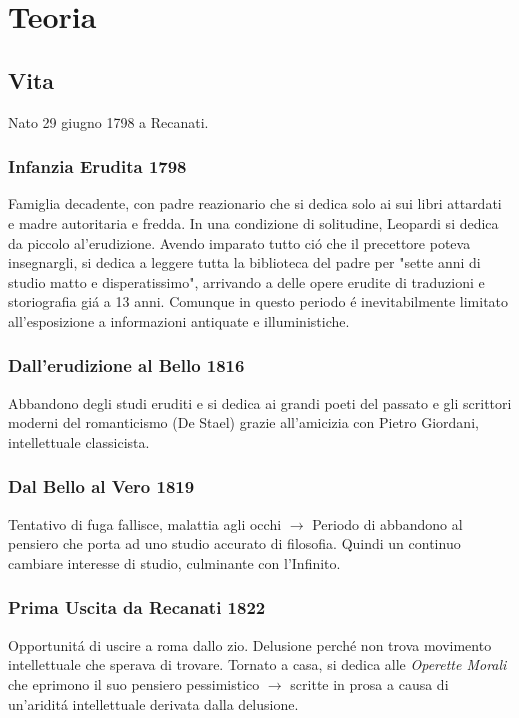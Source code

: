 \documentclass{report}
\title{\jobname}
\author{Eugenio Animali}
\begin{document}
\maketitle
\tableofcontents

\chapter{Teoria}

\section{Vita}
Nato 29 giugno 1798 a Recanati.
\subsection*{Infanzia Erudita 1798}
Famiglia decadente, con padre reazionario che si dedica solo ai sui libri attardati e madre autoritaria e fredda. In una condizione di solitudine, Leopardi si dedica da piccolo al'erudizione. Avendo imparato tutto ció che il precettore poteva insegnargli, si dedica a leggere tutta la biblioteca del padre per "sette anni di studio matto e disperatissimo", arrivando a delle opere erudite di traduzioni e storiografia giá a 13 anni. Comunque in questo periodo é inevitabilmente limitato all'esposizione a informazioni antiquate e illuministiche.
\subsection*{Dall'erudizione al Bello 1816}
Abbandono degli studi eruditi e si dedica ai grandi poeti del passato e gli scrittori moderni del romanticismo (De Stael) grazie all'amicizia con Pietro Giordani, intellettuale classicista.
\subsection*{Dal Bello al Vero 1819}
Tentativo di fuga fallisce, malattia agli occhi $\to$ Periodo di abbandono al pensiero che porta ad uno studio accurato di filosofia. Quindi un continuo cambiare interesse di studio, culminante con l'Infinito.
\subsection*{Prima Uscita da Recanati 1822}
Opportunitá di uscire a roma dallo zio. Delusione perché non trova movimento intellettuale che sperava di trovare. Tornato a casa, si dedica alle \emph{Operette Morali} che eprimono il suo pensiero pessimistico $\to$ scritte in prosa a causa di un'ariditá intellettuale derivata dalla delusione.
\end{document}
